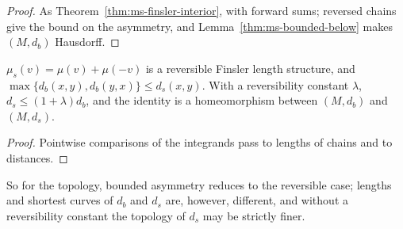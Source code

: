 \begin{proof}
  \leanok
  As Theorem~\ref{thm:ms-finsler-interior}, with forward sums; reversed chains give the bound on
  the asymmetry, and Lemma~\ref{thm:ms-bounded-below} makes $(M, d_b)$ Hausdorff.
\end{proof}

\begin{proposition}[Symmetrization]
  \label{prop:ms-symm}
  \leanok
  $\mu_s(v) = \mu(v) + \mu(-v)$ is a reversible Finsler length structure, and
  $\max\{d_b(x, y), d_b(y, x)\} \leq d_s(x, y)$. With a reversibility constant $\lambda$,
  $d_s \leq (1 + \lambda) d_b$, and the identity is a homeomorphism between $(M, d_b)$ and
  $(M, d_s)$.
\end{proposition}

\begin{proof}
  \leanok
  Pointwise comparisons of the integrands pass to lengths of chains and to distances.
\end{proof}

So for the topology, bounded asymmetry reduces to the reversible case; lengths and shortest curves
of $d_b$ and $d_s$ are, however, different, and without a reversibility constant the topology of
$d_s$ may be strictly finer.
